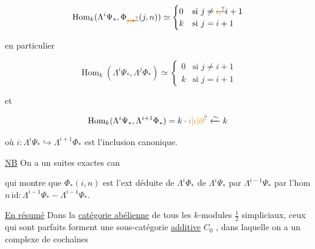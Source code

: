 \[
\operatorname{Hom}_k(\Lambda^i\Psi_{\ast},\Phi_{\deleted{\unsure{j|\bullet}}}(j,n))\simeq
\begin{cases}0&\text{si }j\ne\deleted{\unsure{i,}}i+1\\k&\text{si }j=i+1\end{cases}
\]

en particulier

\[
\operatorname{Hom}_k(\Lambda^i\Psi_{\ast},\Lambda^j\Phi_{\ast})\simeq
\begin{cases}0&\text{si }j\ne i+1\\k&\text{si }j=i+1\end{cases}
\]

et

\[
\operatorname{Hom}_k(\Lambda^i\Psi_{\ast},\Lambda^{i+1}\Phi_{\ast})=k\cdot\unsure{i|\iota|\partial}\xleftarrow{\sim}k
\]

où $i:\Lambda^i\Psi_{\ast}\hookrightarrow\Lambda^{i+1}\Phi_{\ast}$ est l'inclusion canonique.

\uline{NB} On a un  suites exactes can


qui montre que $\Phi_{\ast}(i,n)$ est l'ext déduite de  $\Lambda^i\Phi_{\ast}$ de $\Lambda^i\Psi_{\ast}$ par $\Lambda^{i-1}\Psi_{\ast}$ par l'hom $n\,\mathrm{id}:\Lambda^{i-1}\Psi_{\ast}\mathrel{-}\Lambda^{i-1}\Psi_{\ast}$.


\uline{En résumé} Dans la \uline{catégorie abélienne}  de tous les $k$-modules $\frac12$ simpliciaux, ceux qui sont parfaits forment une sous-catégorie \uline{additive} $C_0$ , dans laquelle on a un complexe de cochaînes


